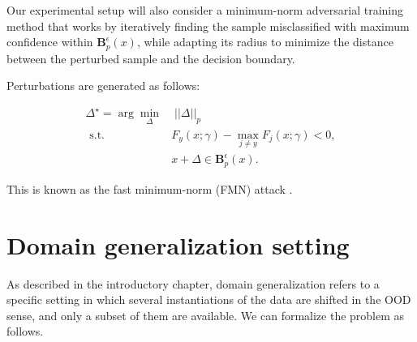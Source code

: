 Our experimental setup will also consider a minimum-norm 
adversarial training method that works by iteratively finding the 
sample misclassified with maximum confidence within $\mathbf{B}_p^\epsilon(x)$,
while adapting its radius to minimize the distance between the perturbed
sample and the decision boundary.

\begin{attack}[FMN]
    Perturbations are generated as follows:
    
    $$
        \begin{aligned}
            \Delta^\star = \arg \min_\Delta & \; ||\Delta||_p \\
            \text { s.t. } & F_y(x; \gamma)- \max_{j \neq y} F_j(x; \gamma) < 0, \\
            & x + \Delta \in \mathbf{B}_p^\epsilon(x).
        \end{aligned}
    $$

    This is known as the fast minimum-norm (FMN) attack
    \cite{pintorFastMinimumnormAdversarial2021}.
\end{attack}


\section{Domain generalization setting}\label{sec:domain_generalization_setting}

As described in the introductory chapter, domain generalization
refers to a specific setting in which several instantiations of
the data are shifted in the OOD sense, and only a subset of them
are available. We can formalize the problem as follows.

